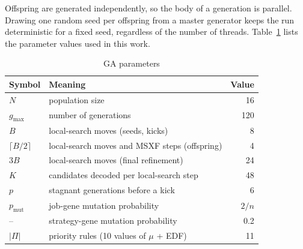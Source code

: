 \documentclass[conference]{IEEEtran}
\begin{document}
Offspring are generated independently, so the body of a generation is parallel. Drawing one random seed per offspring from a master generator keeps the run deterministic for a fixed seed, regardless of the number of threads. Table~\ref{tab:ga-params} lists the parameter values used in this work.

\begin{table}[t]
 \caption{GA parameters}
 \label{tab:ga-params}
 \centering
 \footnotesize
 \begin{tabular}{llr}
  \hline
  Symbol & Meaning & Value \\
  \hline
  $N$ & population size & 16 \\
  $g_{\max}$ & number of generations & 120 \\
  $B$ & local-search moves (seeds, kicks) & 8 \\
  $\lceil B/2\rceil$ & local-search moves and MSXF steps (offspring) & 4 \\
  $3B$ & local-search moves (final refinement) & 24 \\
  $K$ & candidates decoded per local-search step & 48 \\
  $p$ & stagnant generations before a kick & 6 \\
  $p_{\mathrm{mut}}$ & job-gene mutation probability & $2/n$ \\
  -- & strategy-gene mutation probability & 0.2 \\
  $|\Pi|$ & priority rules (10 values of $\mu$ + EDF) & 11 \\
  \hline
 \end{tabular}
\end{table}
\end{document}
